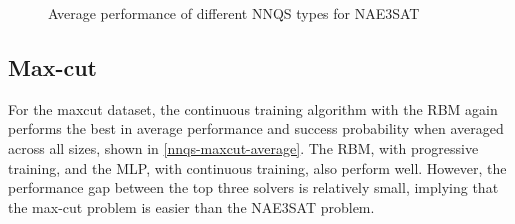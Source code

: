 \begin{figure}[!htb]
    \centering
    \caption{Average performance of different NNQS types for NAE3SAT}
    \label{nnqs-nae3sat-average}
\end{figure}

\subsection{Max-cut}
For the maxcut dataset, the continuous training algorithm with the RBM again performs the best in average performance and success probability when averaged across all sizes, shown in \autoref{nnqs-maxcut-average}. The RBM, with progressive training, and the MLP, with continuous training, also perform well. However, the performance gap between the top three solvers is relatively small, implying that the max-cut problem is easier than the NAE3SAT problem.

